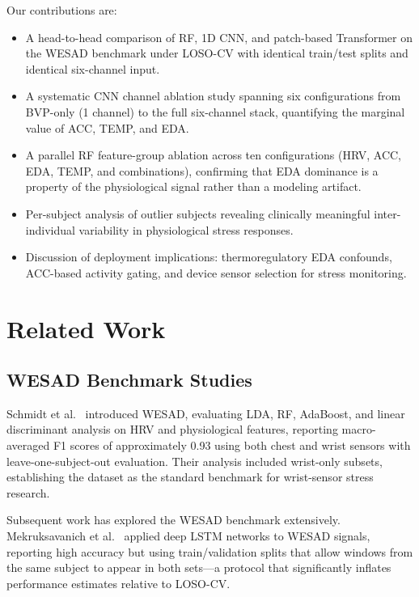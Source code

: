 \documentclass[10pt,twocolumn]{article}
\begin{document}
Our contributions are:
\begin{itemize}
  \item A head-to-head comparison of RF, 1D CNN, and patch-based Transformer
  on the WESAD benchmark under LOSO-CV with identical train/test splits
  and identical six-channel input.
  \item A systematic CNN channel ablation study spanning six configurations
  from BVP-only (1 channel) to the full six-channel stack, quantifying
  the marginal value of ACC, TEMP, and EDA.
  \item A parallel RF feature-group ablation across ten configurations
  (HRV, ACC, EDA, TEMP, and combinations), confirming that EDA dominance
  is a property of the physiological signal rather than a modeling artifact.
  \item Per-subject analysis of outlier subjects revealing clinically meaningful
  inter-individual variability in physiological stress responses.
  \item Discussion of deployment implications: thermoregulatory EDA confounds,
  ACC-based activity gating, and device sensor selection for stress monitoring.
\end{itemize}

\section{Related Work}
\label{sec:related}

\subsection{WESAD Benchmark Studies}

Schmidt et al.~\cite{schmidt2018wesad} introduced WESAD, evaluating LDA,
RF, AdaBoost, and linear discriminant analysis on HRV and physiological
features, reporting macro-averaged F1 scores of approximately 0.93 using
both chest and wrist sensors with leave-one-subject-out evaluation.
Their analysis included wrist-only subsets, establishing the dataset as
the standard benchmark for wrist-sensor stress research.

Subsequent work has explored the WESAD benchmark extensively.
Mekruksavanich et al.~\cite{mekruksavanich2021} applied deep LSTM networks
to WESAD signals, reporting high accuracy but using train/validation splits
that allow windows from the same subject to appear in both sets---a protocol
that significantly inflates performance estimates relative to LOSO-CV.
\end{document}
